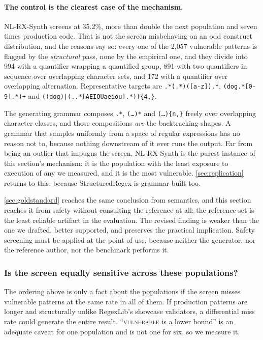 \documentclass[11pt]{article}
\newcommand{\vuln}{\textsc{vulnerable}}
\begin{document}
\paragraph{The control is the clearest case of the mechanism.} NL-RX-Synth
screens at 35.2\%, more than double the next population and seven times
production code. That is not the screen misbehaving on an odd construct
distribution, and the reasons say so: every one of the 2{,}057 vulnerable
patterns is flagged by the \emph{structural} pass, none by the empirical one,
and they divide into 994 with a quantifier wrapping a quantified group, 891
with two quantifiers in sequence over overlapping character sets, and 172 with
a quantifier over overlapping alternation. Representative targets are
\lstinline!.*(.*)([a-z]).*!, \lstinline!(dog.*[0-9].*)+! and
\lstinline!((dog)|(..*[AEIOUaeiou].*)){4,}!.

The generating grammar composes \texttt{.*}, \texttt{(\ldots)*} and
\texttt{(\ldots)\{n,\}} freely over overlapping character classes, and those
compositions \emph{are} the backtracking shapes. A grammar that samples
uniformly from a space of regular expressions has no reason not to, because
nothing downstream of it ever runs the output. Far from being an outlier that
impugns the screen, NL-RX-Synth is the purest instance of this section's
mechanism: it is the population with the least exposure to execution of any we
measured, and it is the most vulnerable. \cref{sec:replication} returns to
this, because StructuredRegex is grammar-built too.

\cref{sec:goldstandard} reaches the same conclusion from semantics, and this
section reaches it from safety without consulting the reference at all: the
reference set is the least reliable artifact in the evaluation. The revised
finding is weaker than the one we drafted, better supported, and preserves
the practical implication. Safety screening must be applied at the point of
use, because neither the generator, nor the reference author, nor the
benchmark performs it.

\subsubsection{Is the screen equally sensitive across these populations?}
\label{sec:calibration}

The ordering above is only a fact about the populations if the screen misses
vulnerable patterns at the same rate in all of them. If production patterns
are longer and structurally unlike RegexLib's showcase validators, a
differential miss rate could generate the entire result. ``\vuln{} is a lower
bound'' is an adequate caveat for one population and is not one for six, so we
measure it.
\end{document}
